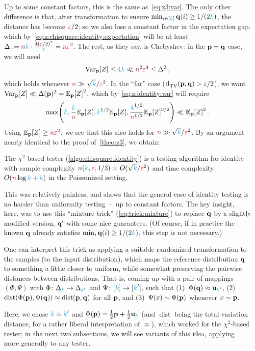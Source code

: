 Up to some constant factors, this is the same as~\eqref{eq:z3:var}. The only other difference is that, after transformation to ensure $\min_{i\in[{\textcolor{cyan}{k}}]} \mathbf{q}(i) \geq 1/(2{\textcolor{cyan}{k}})$, the distance has become $\textcolor{red}{\varepsilon}/2$; so we also lose a constant factor in the expectation gap, which by~\cref{eq:z:chisquare:identity:expectation} will be at least $\Delta := {\textcolor{purple}{n}}{\textcolor{cyan}{k}} \cdot \frac{4(\textcolor{red}{\varepsilon}/2)^2}{{\textcolor{cyan}{k}}} = {\textcolor{purple}{n}}\textcolor{red}{\varepsilon}^2$. The rest, as they say, is Chebyshev: in the $\mathbf{p}=\mathbf{q}$ case, we will need
\[
    \operatorname{Var}_{\mathbf{p}}[Z] \leq 4{\textcolor{cyan}{k}} \ll {\textcolor{purple}{n}}^2\textcolor{red}{\varepsilon}^4 \leq \Delta^2\,,
\]
which holds whenever ${\textcolor{purple}{n}} \gg \sqrt{{\textcolor{cyan}{k}}}/{\textcolor{red}{\varepsilon}^2}$. 
In the ``far'' case ($\totalvardist{\p}{\q} > \eps/2$), we want $\Var_\p[Z] \ll \Delta(\p)^2 = \bE{\p}{Z}^2$, which by~\cref{eq:z:identity:var} will require
\[
    \max\Paren{\ab, \frac{\ab}{\ns}\bE{\p}{Z}, \ab^{1/2}\bE{\p}{Z} , \frac{\ab^{1/2}}{\ns^{1/2}}\bE{\p}{Z}^{3/2} } \ll \bE{\p}{Z}^2\,.
\]
Using $\bE{\p}{Z} \geq \ns\dst^2$, we see that this also holds for ${\textcolor{purple}{n}} \gg \sqrt{{\textcolor{cyan}{k}}}/{\textcolor{red}{\varepsilon}^2}$. By an argument nearly identical to the proof of~\cref{theo:z3}, we obtain:
\begin{theorem}
  \label{theo:z}
The $\chi^2$-based tester (\cref{algo:chisquare:identity}) is a testing algorithm for identity with sample complexity ${\textcolor{purple}{n}}({\textcolor{cyan}{k}},\textcolor{red}{\varepsilon},1/3) = O(\sqrt{{\textcolor{cyan}{k}}}/\textcolor{red}{\varepsilon}^2)$ and time complexity $O({\textcolor{purple}{n}}\log{\textcolor{cyan}{k}}+{\textcolor{cyan}{k}})$ in the Poissonized setting.
\end{theorem}
This was relatively painless, and shows that the general case of identity testing is no harder than uniformity testing~--~up to constant factors. The key insight, here, was to use this ``mixture trick'' (\cref{eq:trick:mixture}) to replace $\mathbf{q}$ by a slightly modified version, $\mathbf{q}'$ with some nice guarantees. (Of course, if in practice the known $\mathbf{q}$ already satisfies $\min_i \mathbf{q}(i) \geq 1/(2{\textcolor{cyan}{k}})$, this step is not necessary.)\smallskip


One can interpret this trick as applying a suitable randomized transformation to the samples (\ie to the input distribution), which maps the reference distribution $\mathbf{q}$ to something a little closer to uniform, while somewhat preserving the pairwise distances between distributions. That is, coming up with a pair of mappings $(\Phi,\Psi)$ with $\Phi\colon\Delta_{{\textcolor{cyan}{k}}} \to \Delta_{{\textcolor{cyan}{k}}'}$ and $\Psi\colon[{\textcolor{cyan}{k}}]\to[{\textcolor{cyan}{k}}']$, such that (1)~$\Phi(\mathbf{q})\approx \mathbf{u}_{{\textcolor{cyan}{k}}'}$, (2)~$\operatorname{dist}(\Phi(\mathbf{p}),\Phi(\mathbf{q}))\approx \operatorname{dist}(\mathbf{p},\mathbf{q})$ for all $\mathbf{p}$, and (3)~$\Psi(x)\sim \Phi(\mathbf{p})$ whenever $x\sim\mathbf{p}$.

Here, we chose ${\textcolor{cyan}{k}}={\textcolor{cyan}{k}}'$ and $\Phi(\mathbf{p}) = \frac{1}{2}\mathbf{p}+\frac{1}{2}\mathbf{u}_{\textcolor{cyan}{k}}$ (and $\operatorname{dist}$ being the total variation distance, for a rather liberal interpretation of $\approx$), which worked for the $\chi^2$-based tester; in the next two subsections, we will see variants of this idea, applying more generally to any tester.
